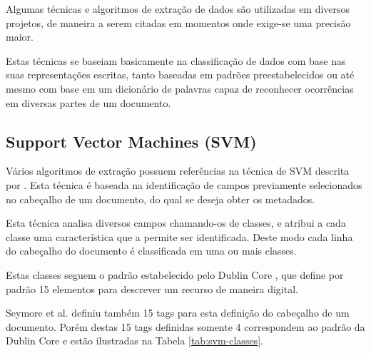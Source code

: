 Algumas técnicas e algoritmos de extração de dados são utilizadas em diversos projetos, de maneira a serem citadas em momentos onde exige-se uma precisão maior.

Estas técnicas se baseiam basicamente na classificação de dados com base nas suas representações escritas, tanto baseadas em padrões preestabelecidos ou até mesmo com base em um dicionário de palavras capaz de reconhecer ocorrências em diversas partes de um documento.

\subsection{Support Vector Machines (SVM)}

Vários algoritmos de extração possuem referências na técnica de SVM descrita por  \cite{svm}. Esta técnica é baseada na identificação de campos previamente selecionados no cabeçalho de um documento, do qual se deseja obter os metadados.

Esta técnica analisa diversos campos chamando-os de classes, e atribui a cada classe uma característica que a permite ser identificada. Deste modo cada linha do cabeçalho do documento é classificada em uma ou mais classes.

Estas classes seguem o padrão \cite{dublin-core} estabelecido pelo Dublin Core \cite{dublin-core}, que define por padrão 15 elementos para descrever um recurso de maneira digital.

Seymore et al. \cite{seymore} definiu também 15 tags para esta definição do cabeçalho de um documento. Porém destas 15 tags definidas somente 4 correspondem ao padrão da Dublin Core e estão ilustradas na Tabela \ref{tab:svm-classes}.

